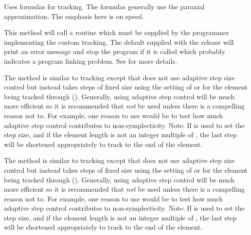 \begin{description}

\item[\vn{Bmad_Standard}]
Uses formulas for tracking. The formulas generally use the paraxial approximation. The emphasis
here is on speed.

\item[\vn{Custom}]
This method will call a routine  which must be
supplied by the programmer implementing the custom tracking. The
default  supplied with the \bmad release will print
an error message and stop the program if it is called which probably
indicates a program linking problem. See  for more details.

\item[\vn{fixed_step_runge_kutta}]
The  method is similar to  tracking except that
 does not use adaptive step size control but instead takes steps of fixed
size using the setting of  or  for the element being tracked through ().
Generally, using adaptive step control will be much more efficient so it is recommended that
 {\em not} be used unless there is a compelling reason not to. For
example, one reason to use  would be to test how much adaptive step
control contributes to non-symplecticity. Note: If  is used to set the step size, and if the
element length is not an integer multiple of , the last step will be shortened appropriately
to track to the end of the element.

\item[\vn{fixed_step_time_runge_kutta}]
The  method is similar to  tracking except that
 does not use adaptive step size control but instead takes steps of fixed
size using the setting of  or  for the element being tracked through ().
Generally, using adaptive step control will be much more efficient so it is recommended that
 {\em not} be used unless there is a compelling reason not to. For
example, one reason to use  would be to test how much adaptive step
control contributes to non-symplecticity. Note: If  is used to set the step size, and if the
element length is not an integer multiple of , the last step will be shortened appropriately
to track to the end of the element.


\end{description}
